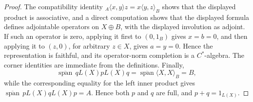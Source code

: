 \documentclass{book}
\def\cstar{\(C^*\)-algebra}
\begin{document}
\begin{proof}
  The compatibility identity
  \({}_A\langle x,y\rangle z=x\langle y,z\rangle_B\) shows that the
  displayed product is associative, and a direct computation shows that the
  displayed formula defines adjointable operators on \(X\oplus B\), with the
  displayed involution as adjoint. If such an operator is zero, applying it
  first to \((0,1_B)\) gives \(x=b=0\), and then applying it to \((z,0)\),
  for arbitrary \(z\in X\), gives \(a=y=0\). Hence the representation is
  faithful, and its operator-norm completion is a \cstar. The corner
  identities are immediate from the definitions. Finally,
  \[
    \overline{\operatorname{span}}\,qL(X)pL(X)q
    =\overline{\operatorname{span}}\langle X,X\rangle_B=B,
  \]
  while the corresponding equality for the left inner product gives
  \(\overline{\operatorname{span}}\,pL(X)qL(X)p=A\). Hence both \(p\) and
  \(q\) are full, and \(p+q=1_{L(X)}\).
\end{proof}
\end{document}
